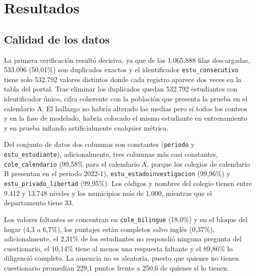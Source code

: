 \section{Resultados}
    \subsection{Calidad de los datos}
        La primera verificación resultó decisiva, ya que de las 1.065.888 filas
        descargadas, 533.096 (50,01\%) son duplicados exactos y el identificador
        \texttt{estu\_consecutivo} tiene solo 532.792 valores distintos donde cada
        registro aparece dos veces en la tabla del portal. Tras eliminar los
        duplicados quedan 532.792 estudiantes con identificador único, cifra
        coherente con la población que presenta la prueba en el calendario A. El
        hallazgo no habría alterado las medias pero sí todos los conteos y en
        la fase de modelado, habría colocado el mismo estudiante en entrenamiento
        y en prueba inflando artificialmente cualquier métrica.

        \vspace{10pt}

        {\sloppy{}
        Del conjunto de datos dos columnas son constantes (\texttt{periodo} y 
        \texttt{estu\_estudiante}), adicionalmente, tres columnas más casi 
        constantes, \texttt{cole\_calendario} (99,58\% para el calendario A, 
        porque los colegios de calendario B presentan en el periodo 2022-1), 
        \texttt{estu\_estadoinvestigacion} (99,96\%) y \texttt{estu\_privado\_libertad} 
        (99,95\%). Los códigos y nombres del colegio tienen entre 9.412 y 13.748 
        niveles y los municipios más de 1.000, mientras que el departamento tiene 33.
        \par}

        \vspace{10pt}

        Los valores faltantes se concentran en \texttt{cole\_bilingue} (18,0\%) 
        y en el bloque del hogar (4,3 a 6,7\%), los puntajes están completos 
        salvo inglés (0,37\%), adicionalmente, el 2,31\% de los estudiantes no 
        respondió ninguna pregunta del cuestionario, el 10,14\% tiene al menos 
        una respuesta faltante y el 89,86\% lo diligenció completo. La ausencia 
        no es aleatoria, puesto que quienes no tienen cuestionario promedian 
        229,1 puntos frente a 250,6 de quienes sí lo tienen.

